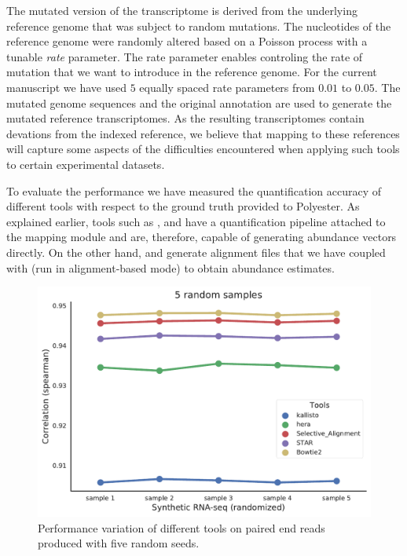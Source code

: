 The mutated version of the transcriptome is derived from the underlying reference genome that was subject to 
random mutations. The nucleotides of the reference genome were randomly altered based on a Poisson process with 
a tunable {\it rate} parameter. The rate parameter enables controling the rate of mutation that we want to 
introduce in the reference genome. For the current manuscript we have used $5$ equally spaced rate parameters 
from $0.01$ to $0.05$. The mutated genome sequences and the original annotation are used to generate the mutated 
reference transcriptomes. As the resulting transcriptomes contain devations from the indexed reference, we believe 
that mapping to these references will capture some aspects of the difficulties encountered when applying such tools 
to certain experimental datasets.

To evaluate the performance we have measured the quantification accuracy of different tools with respect to the 
ground truth provided to Polyester. As explained earlier, tools such as \kallisto, \hera and \sla have a 
quantification pipeline attached to the mapping module and are, therefore, capable of generating abundance 
vectors directly. On the other hand, \bt and \STAR generate alignment files that we have coupled with \salmon 
(run in alignment-based mode) to obtain abundance estimates.

\begin{figure}
 \centering
 \includegraphics[scale=0.40]{Figures/sla/standard_error}
 \caption[Performance of tools on paired end reads]{Performance variation of 
 different tools on paired end reads produced with five random seeds.}
  \label{fig:random_samples}
\end{figure}

